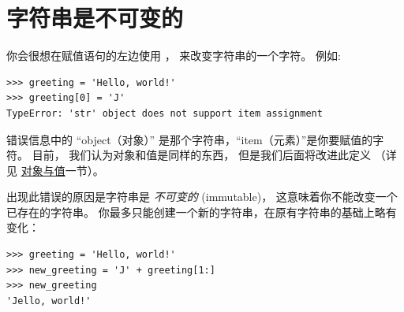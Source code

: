   


\section{字符串是不可变的}
    


你会很想在赋值语句的左边使用 \li{[]}， 来改变字符串的一个字符。 例如:
  

\begin{lstlisting}
>>> greeting = 'Hello, world!'
>>> greeting[0] = 'J'
TypeError: 'str' object does not support item assignment
\end{lstlisting}

%
    
  

错误信息中的 ``object（对象）'' 是那个字符串，``item（元素）''是你要赋值的字符。 目前， 我们认为对象和值是同样的东西， 但是我们后面将改进此定义 （详见 \hyperref[equivalence]{对象与值}一节）。


出现此错误的原因是字符串是 {\em 不可变的} (immutable)， 这意味着你不能改变一个已存在的字符串。 你最多只能创建一个新的字符串，在原有字符串的基础上略有变化：

\begin{lstlisting}
>>> greeting = 'Hello, world!'
>>> new_greeting = 'J' + greeting[1:]
>>> new_greeting
'Jello, world!'
\end{lstlisting}

